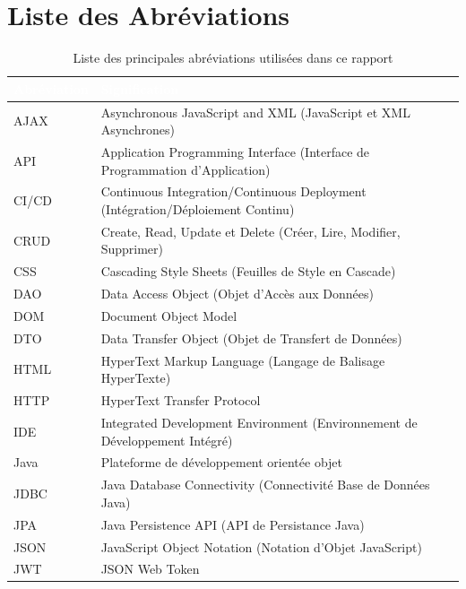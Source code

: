 \documentclass[12pt,a4paper]{report}
\begin{document}
\chapter*{Liste des Abréviations}

\begin{longtable}[]{@{}
  >{\raggedright\arraybackslash}p{}
  >{\raggedright\arraybackslash}p{}@{}}
\caption{Liste des principales abréviations utilisées dans ce rapport}
\label{tab:abreviations}\\
\toprule()
\cellcolor{capgeminiblue}\textcolor{white}{\textbf{Abréviation}} & \cellcolor{capgeminiblue}\textcolor{white}{\textbf{Signification}} \\
\midrule()
\endhead
\rowcolor{lightgray}
AJAX & Asynchronous JavaScript and XML (JavaScript et XML Asynchrones) \\
API & Application Programming Interface (Interface de Programmation d'Application) \\
\rowcolor{lightgray}
CI/CD & Continuous Integration/Continuous Deployment (Intégration/Déploiement Continu) \\
CRUD & Create, Read, Update et Delete (Créer, Lire, Modifier, Supprimer) \\
\rowcolor{lightgray}
CSS & Cascading Style Sheets (Feuilles de Style en Cascade) \\
DAO & Data Access Object (Objet d'Accès aux Données) \\
\rowcolor{lightgray}
DOM & Document Object Model \\
DTO & Data Transfer Object (Objet de Transfert de Données) \\
\rowcolor{lightgray}
HTML & HyperText Markup Language (Langage de Balisage HyperTexte) \\
HTTP & HyperText Transfer Protocol \\
\rowcolor{lightgray}
IDE & Integrated Development Environment (Environnement de Développement Intégré) \\
Java & Plateforme de développement orientée objet \\
\rowcolor{lightgray}
JDBC & Java Database Connectivity (Connectivité Base de Données Java) \\
JPA & Java Persistence API (API de Persistance Java) \\
\rowcolor{lightgray}
JSON & JavaScript Object Notation (Notation d'Objet JavaScript) \\
JWT & JSON Web Token \\

\end{longtable}
\end{document}
